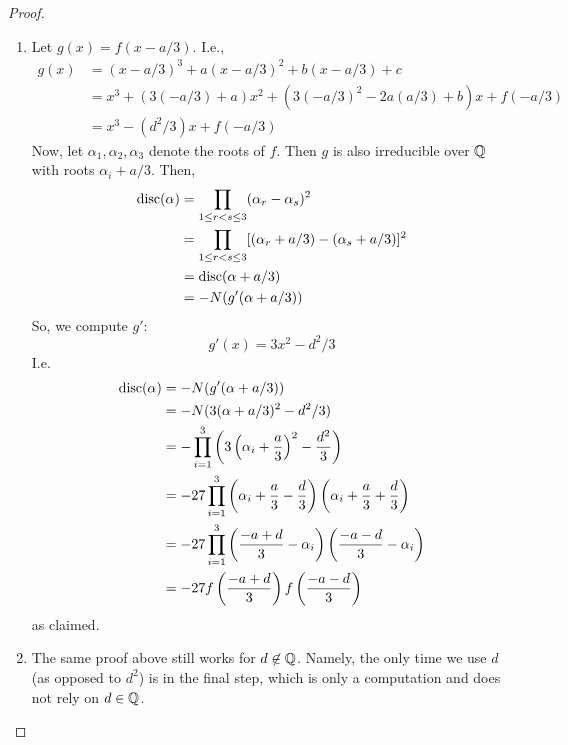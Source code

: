 \begin{proof} ${}$
\begin{enumerate}
\item
    Let $g(x) = f(x-a/3)$. I.e.,
    \begin{align*}
    g(x)
        &= (x-a/3)^3 + a(x-a/3)^2 + b(x-a/3) + c \\
        &= x^3 + (3(-a/3)+a)x^2 + (3(-a/3)^2-2a(a/3)+b)x + f(-a/3) \\
        &= x^3 - (d^2/3)x + f(-a/3)
    \end{align*}
    Now, let $\alpha_1,\alpha_2,\alpha_3$ denote the roots of $f$. Then $g$ is also irreducible over $\mathbb{Q}$ with roots $\alpha_i+a/3$. Then,
    \begin{align*}
    \operatorname{disc}(\alpha)
        &= \prod_{1 \leq r < s \leq 3} (\alpha_r-\alpha_s)^2 \\
        &= \prod_{1 \leq r < s \leq 3} [(\alpha_r+a/3)-(\alpha_s+a/3)]^2 \\
        &= \operatorname{disc}(\alpha+a/3) \\
        &= -N(g'(\alpha+a/3))
    \end{align*}
    So, we compute $g'$:
    \[ g'(x) = 3x^2 - d^2/3 \]
    I.e.
    \begin{align*}
    \operatorname{disc}(\alpha)
        &= -N(g'(\alpha+a/3)) \\
        &= -N(3(\alpha+a/3)^2-d^2/3) \\
        &= -\prod_{i=1}^3 \left(3\left(\alpha_i+\frac{a}{3}\right)^2-\frac{d^2}{3}\right) \\
        &= -27\prod_{i=1}^3 \left(\alpha_i+\frac{a}{3}-\frac{d}{3}\right)\left(\alpha_i+\frac{a}{3}+\frac{d}{3}\right) \\
        &= -27\prod_{i=1}^3 \left(\frac{-a+d}{3}-\alpha_i\right)\left(\frac{-a-d}{3}-\alpha_i\right) \\
        &= -27f\left(\frac{-a+d}{3}\right)f\left(\frac{-a-d}{3}\right)
    \end{align*}
    as claimed.

\item
    The same proof above still works for $d \not\in \mathbb{Q}$. Namely, the only time we use $d$ (as opposed to $d^2$) is in the final step, which is only a computation and does not rely on $d \in \mathbb{Q}$.


\end{enumerate}
\end{proof}
